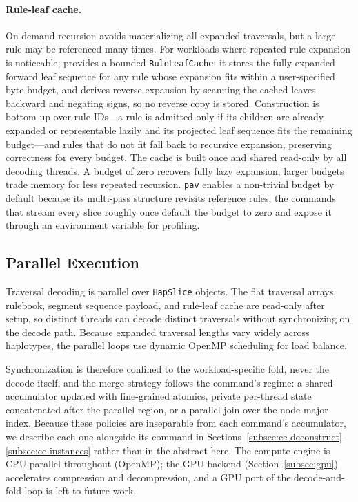 \paragraph{Rule-leaf cache.}\label{subsec:ce-cache}
On-demand recursion avoids materializing all expanded traversals, but a large rule
may be referenced many times. For workloads where repeated rule expansion is
noticeable, \gfaz provides a bounded \texttt{RuleLeafCache}: it stores the fully
expanded forward leaf sequence for any rule whose expansion fits within a
user-specified byte budget, and derives reverse expansion by scanning the cached
leaves backward and negating signs, so no reverse copy is stored. Construction is
bottom-up over rule IDs---a rule is admitted only if its children are already
expanded or representable lazily and its projected leaf sequence fits the remaining
budget---and rules that do not fit fall back to recursive expansion, preserving
correctness for every budget. The cache is built once and shared read-only by all
decoding threads. A budget of zero recovers fully lazy expansion; larger budgets
trade memory for less repeated recursion. \texttt{pav} enables a non-trivial budget
by default because its multi-pass structure revisits reference rules; the commands
that stream every slice roughly once default the budget to zero and expose it
through an environment variable for profiling.

\subsection{Parallel Execution}\label{subsec:ce-parallel}

Traversal decoding is parallel over \texttt{HapSlice} objects. The flat traversal
arrays, rulebook, segment sequence payload, and rule-leaf cache are read-only
after setup, so distinct threads can decode distinct traversals without
synchronizing on the decode path. Because expanded traversal lengths vary widely
across haplotypes, the parallel loops use dynamic OpenMP scheduling for load
balance.

Synchronization is therefore confined to the workload-specific fold, never the
decode itself, and the merge strategy follows the command's regime: a shared
accumulator updated with fine-grained atomics, private per-thread state
concatenated after the parallel region, or a parallel join over the node-major
index. Because these policies are inseparable from each command's accumulator, we
describe each one alongside its command in
Sections~\ref{subsec:ce-deconstruct}--\ref{subsec:ce-instances} rather than in the
abstract here. The compute engine is CPU-parallel throughout (OpenMP); the GPU
backend (Section~\ref{subsec:gpu}) accelerates compression and decompression, and a
GPU port of the decode-and-fold loop is left to future work.

